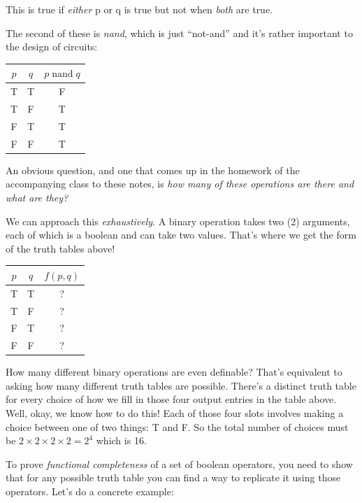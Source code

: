 \documentclass[11pt]{article}
\begin{document}
This is true if \emph{either} p or q is true but not when \emph{both} are true.

The second of these is \emph{nand}, which is just ``not-and'' and it's rather important to the design of circuits:

\begin{center}
\begin{tabular}{cc|c}
\toprule
$p$ & $q$ & $p \mathbin{\text{nand}} q$ \\
\midrule
T & T & F \\
T & F & T \\
F & T & T \\
F & F & T \\
\bottomrule
\end{tabular}
\end{center}

An obvious question, and one that comes up in the homework of the accompanying class to these notes, is \emph{how many of these operations are there and what are they?}

We can approach this \emph{exhaustively}. A binary operation takes two (2) arguments, each of which is a boolean and can take two values. That's where we get the form of the truth tables above!

\begin{center}
\begin{tabular}{cc|c}
\toprule
$p$ & $q$ & $f(p,q)$ \\
\midrule
T & T & ? \\
T & F & ? \\
F & T & ? \\
F & F & ? \\
\bottomrule
\end{tabular}
\end{center}

How many different binary operations are even definable? That's equivalent to asking how many different truth tables are possible. There's a distinct truth table for every choice of how we fill in those four output entries in the table above. Well, okay, we know how to do this! Each of those four slots involves making a choice between one of two things: T and F. So the total number of choices must be $2 \times 2 \times 2 \times 2 = 2^4$ which is 16.

To prove \emph{functional completeness} of a set of boolean operators, you need to show that for any possible truth table you can find a way to replicate it using those operators. Let's do a concrete example:
\end{document}
